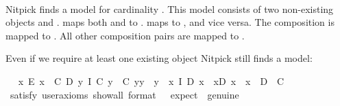 \begin{isabellebody}
\isadelimproof
\ %
\endisadelimproof
%
\isatagproof
{}\isamarkupfalse%
\ \ %
%
\endisatagproof
{\isafoldproof}%
%
\isadelimproof
%
\endisadelimproof
%
\begin{isamarkuptext}%
Nitpick finds a model for cardinality . This model consists of two non-existing
   objects  and .  maps both  and  to
   .  maps  to , and vice versa. The composition 
   is mapped to . All other composition pairs are mapped to .%
\end{isamarkuptext}\isamarkuptrue%
%
\begin{isamarkuptext}%
Even if we require at least one existing object Nitpick still finds a model:%
\end{isamarkuptext}\isamarkuptrue%
\ \isamarkupfalse%
\ {\isachardoublequoteopen}{\isacharparenleft}{\isasymexists}x{\isachardot}\ E\ x{\isacharparenright}\ \isactrlbold {\isasymand}\ {\isacharparenleft}{\isasymexists}C\ D{\isachardot}\ {\isacharparenleft}\isactrlbold {\isasymforall}y{\isachardot}\ I\ {\isacharparenleft}C\ y{\isacharparenright}\ \isactrlbold {\isasymand}\ {\isacharparenleft}C\ y{\isacharparenright}{\isasymcdot}y\ {\isasymcong}\ y{\isacharparenright}\ \isactrlbold {\isasymand}\ {\isacharparenleft}\isactrlbold {\isasymforall}x{\isachardot}\ I\ {\isacharparenleft}D\ x{\isacharparenright}\ \isactrlbold {\isasymand}\ x{\isasymcdot}{\isacharparenleft}D\ x{\isacharparenright}\ {\isasymcong}\ x{\isacharparenright}\ \isactrlbold {\isasymand}\ \isactrlbold {\isasymnot}{\isacharparenleft}D\ {\isacharequal}\ C{\isacharparenright}{\isacharparenright}{\isachardoublequoteclose}\isanewline
\ \ \ \isamarkupfalse%
\ {\isacharbrackleft}satisfy{\isacharcomma}\ user{\isacharunderscore}axioms{\isacharcomma}\ show{\isacharunderscore}all{\isacharcomma}\ format\ {\isacharequal}\ {}{\isacharcomma}\ expect\ {\isacharequal}\ genuine{\isacharbrackright}%
\isadelimproof
\ %
\endisadelimproof
%
\isatagproof
{}\isamarkupfalse%
\ \ %
%
\endisatagproof
{\isafoldproof}%
%
\isadelimproof
%
\endisadelimproof

\end{isabellebody}
